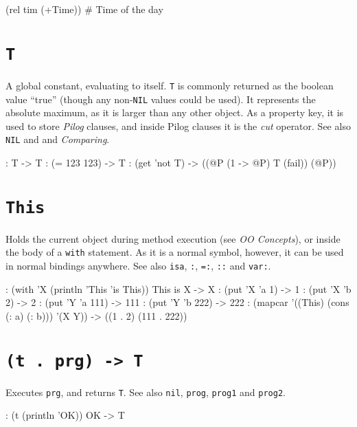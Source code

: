 \begin{wideverbatim}
(rel tim (+Time))  # Time of the day
\end{wideverbatim}

 
\section*{\texttt{T}}
\label{sec:func-ref-T-T}


A global constant, evaluating to itself. \texttt{T} is commonly returned as the
boolean value ``true'' (though any non-\texttt{NIL} values could be used). It
represents the absolute maximum, as it is larger than any other object.
As a property key, it is used to store \emph{Pilog}
clauses, and inside Pilog clauses it is the \emph{cut} operator. See also
\texttt{NIL} and and \emph{Comparing}.


\begin{wideverbatim}
: T
-> T
: (= 123 123)
-> T
: (get 'not T)
-> ((@P (1 -> @P) T (fail)) (@P))
\end{wideverbatim}

 
\section*{\texttt{This}}
\label{sec:func-ref-T-This}


Holds the current object during method execution (see \emph{OO Concepts}), or inside the body of a \texttt{with} statement. As it is a normal
symbol, however, it can be used in normal bindings anywhere. See also
\texttt{isa}, \texttt{:}, \texttt{=:}, \texttt{::} and \texttt{var:}.


\begin{wideverbatim}
: (with 'X (println 'This 'is This))
This is X
-> X
: (put 'X 'a 1)
-> 1
: (put 'X 'b 2)
-> 2
: (put 'Y 'a 111)
-> 111
: (put 'Y 'b 222)
-> 222
: (mapcar '((This) (cons (: a) (: b))) '(X Y))
-> ((1 . 2) (111 . 222))
\end{wideverbatim}

 
\section*{\texttt{(t . prg) -> T}}
\label{sec:func-ref-T-(t . prg) -> T}


Executes \texttt{prg}, and returns \texttt{T}. See also \texttt{nil}, \texttt{prog}, \texttt{prog1} and
\texttt{prog2}.


\begin{wideverbatim}
: (t (println 'OK))
OK
-> T
\end{wideverbatim}

